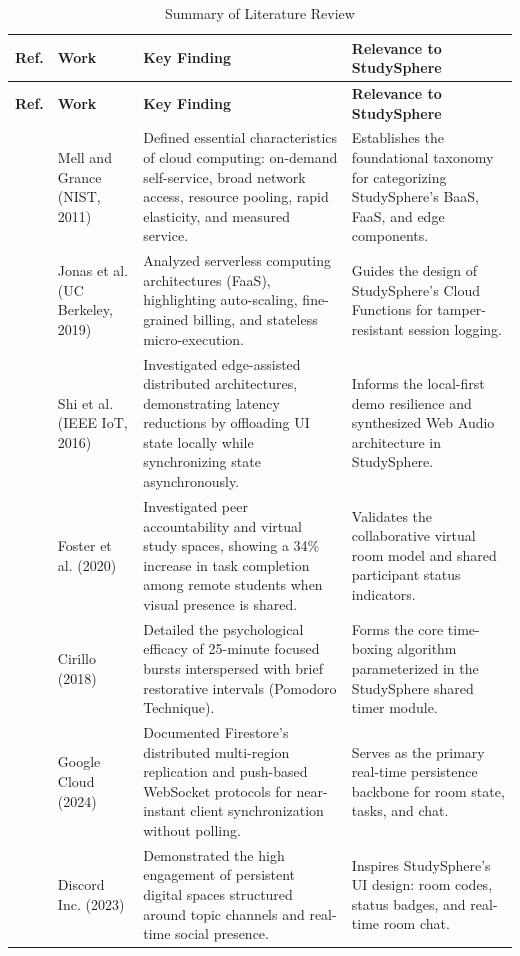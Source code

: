 \documentclass[12pt,a4paper,openany]{report}
\newcommand{\hdr}{\rowcolor{gray!25}}
\begin{document}
{\small
\begin{longtable}{|p{0.9cm}|p{3.3cm}|p{4.9cm}|p{4.9cm}|}
\caption{Summary of Literature Review}\\
\hline
\hdr\textbf{Ref.} & \textbf{Work} & \textbf{Key Finding} & \textbf{Relevance to StudySphere} \\ \hline
\endfirsthead
\hline
\hdr\textbf{Ref.} & \textbf{Work} & \textbf{Key Finding} & \textbf{Relevance to StudySphere} \\ \hline
\endhead
\cite{ref:mell} & Mell and Grance (NIST, 2011) & Defined essential characteristics of cloud computing: on-demand self-service, broad network access, resource pooling, rapid elasticity, and measured service. & Establishes the foundational taxonomy for categorizing StudySphere's BaaS, FaaS, and edge components. \\ \hline
\cite{ref:jonas} & Jonas et al. (UC Berkeley, 2019) & Analyzed serverless computing architectures (FaaS), highlighting auto-scaling, fine-grained billing, and stateless micro-execution. & Guides the design of StudySphere's Cloud Functions for tamper-resistant session logging. \\ \hline
\cite{ref:shi} & Shi et al. (IEEE IoT, 2016) & Investigated edge-assisted distributed architectures, demonstrating latency reductions by offloading UI state locally while synchronizing state asynchronously. & Informs the local-first demo resilience and synthesized Web Audio architecture in StudySphere. \\ \hline
\cite{ref:foster} & Foster et al. (2020) & Investigated peer accountability and virtual study spaces, showing a 34\% increase in task completion among remote students when visual presence is shared. & Validates the collaborative virtual room model and shared participant status indicators. \\ \hline
\cite{ref:pomodoro} & Cirillo (2018) & Detailed the psychological efficacy of 25-minute focused bursts interspersed with brief restorative intervals (Pomodoro Technique). & Forms the core time-boxing algorithm parameterized in the StudySphere shared timer module. \\ \hline
\cite{ref:firestore} & Google Cloud (2024) & Documented Firestore's distributed multi-region replication and push-based WebSocket protocols for near-instant client synchronization without polling. & Serves as the primary real-time persistence backbone for room state, tasks, and chat. \\ \hline
\cite{ref:discord} & Discord Inc. (2023) & Demonstrated the high engagement of persistent digital spaces structured around topic channels and real-time social presence. & Inspires StudySphere's UI design: room codes, status badges, and real-time room chat. \\ \hline

\end{longtable}}
\end{document}
